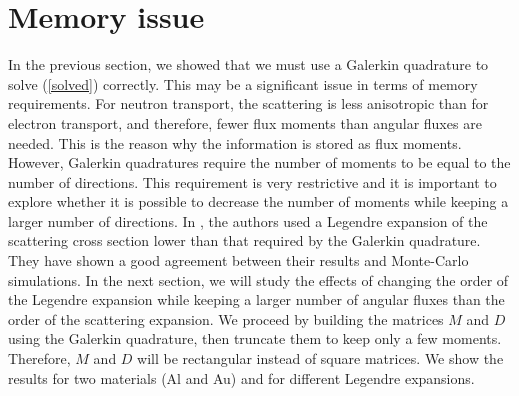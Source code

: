 \section{Memory issue}
In the previous section, we showed that we must use a Galerkin quadrature to solve
(\ref{solved}) correctly. This may be a significant issue in terms of memory
requirements.  
For neutron transport, the scattering is less anisotropic than for electron
transport, and therefore, fewer flux moments than angular 
fluxes are needed. This is the reason why the information is stored as flux moments. 
However, Galerkin quadratures require the number of moments 
to be equal to the number of directions. This requirement is very restrictive and it 
is important to explore whether it is possible to decrease the number of moments 
while keeping a larger number of directions. In \cite{mem}, the authors used a 
Legendre expansion of the scattering cross section lower than that required by the 
Galerkin quadrature. They have shown a good agreement between their results 
and Monte-Carlo simulations. In the next section, we will study the effects of changing 
the order of the Legendre expansion while keeping a larger number of angular 
fluxes than the order of the scattering expansion. We proceed  by building 
the matrices $M$ and $D$ using the Galerkin quadrature, then truncate them 
to keep only a few moments. Therefore, $M$ and $D$ will be rectangular instead 
of square matrices. We show the results for two materials (Al and Au) 
and for different Legendre expansions.
